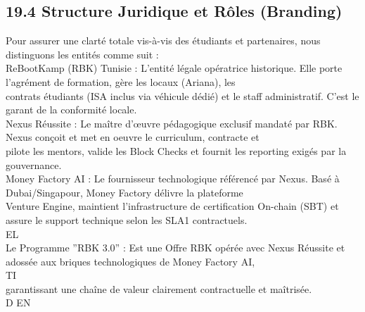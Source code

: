\subsection{19.4 Structure Juridique et Rôles (Branding)}
Pour assurer une clarté totale vis-à-vis des étudiants et partenaires, nous distinguons les entités comme suit :\\
\vspace{0.5em}
ReBootKamp (RBK) Tunisie : L’entité légale opératrice historique. Elle porte l’agrément de formation, gère les locaux (Ariana), les\\
contrats étudiants (ISA inclus via véhicule dédié) et le staff administratif. C’est le garant de la conformité locale.\\
\vspace{0.5em}
Nexus Réussite : Le maître d’œuvre pédagogique exclusif mandaté par RBK. Nexus conçoit et met en oeuvre le curriculum, contracte et\\
pilote les mentors, valide les Block Checks et fournit les reporting exigés par la gouvernance.\\
\vspace{0.5em}
Money Factory AI : Le fournisseur technologique référencé par Nexus. Basé à Dubai/Singapour, Money Factory délivre la plateforme\\
Venture Engine, maintient l’infrastructure de certification On-chain (SBT) et assure le support technique selon les SLA1 contractuels.\\
\vspace{0.5em}
\vspace{0.5em}
\vspace{0.5em}
\vspace{0.5em}
EL\\
Le Programme ”RBK 3.0” : Est une Offre RBK opérée avec Nexus Réussite et adossée aux briques technologiques de Money Factory AI,\\
\vspace{0.5em}
\vspace{0.5em}
\vspace{0.5em}
\vspace{0.5em}
TI\\
garantissant une chaîne de valeur clairement contractuelle et maîtrisée.\\
\vspace{0.5em}
\vspace{0.5em}
\vspace{0.5em}
\vspace{0.5em}
D     EN\\
